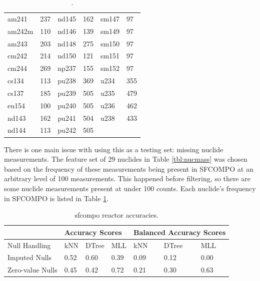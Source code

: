 \begin{table}[!ht]
  \centering
  \begin{tabular}{|>{\raggedleft}m{0.6in}
                                 m{0.4in}
                  |>{\raggedleft}m{0.6in}
                                 m{0.4in}
                  |>{\raggedleft}m{0.6in}
                                 m{0.4in}|}
    \toprule
    am241  & 237 & nd145 & 162 & sm147 & 97  \\
    am242m & 110 & nd146 & 139 & sm149 & 97  \\
    am243  & 203 & nd148 & 275 & sm150 & 97  \\
    cm242  & 214 & nd150 & 121 & sm151 & 97  \\
    cm244  & 269 & np237 & 155 & sm152 & 97  \\
    cs134  & 113 & pu238 & 369 & u234  & 355 \\
    cs137  & 185 & pu239 & 505 & u235  & 479 \\
    eu154  & 100 & pu240 & 505 & u236  & 462 \\
    nd143  & 162 & pu241 & 504 & u238  & 433 \\
    nd144  & 113 & pu242 & 505 &       &     \\ \bottomrule
  \end{tabular}
  \caption{.}
  \label{tbl:missing}
\end{table}

There is one main issue with using this as a testing set: missing nuclide
measurements.  The feature set of 29 nuclides in Table \ref{tbl:nucmass} was
chosen based on the frequency of these measurements being present in
\gls{SFCOMPO} at an arbitrary level of 100 measurements. This happened before
filtering, so there are some nuclide measurements present at under 100 counts.
Each nuclide's frequency in \gls{SFCOMPO} is listed in Table \ref{tbl:missing}.



\begin{table}[!ht]
  \centering
  \begin{tabular}{@{}l|lll|lll@{}}
  \toprule
                   & \multicolumn{3}{l|}{Accuracy Scores} & \multicolumn{3}{l}{Balanced Accuracy Scores} \\ \toprule
  Null Handling    & kNN        & DTree      & MLL       & kNN           & DTree         & MLL           \\ \midrule
  Imputed Nulls    & 0.52       & 0.60       & 0.39      & 0.09          & 0.12          & 0.00          \\
  Zero-value Nulls & 0.45       & 0.42       & 0.72      & 0.21          & 0.30          & 0.63          \\ \bottomrule
  \end{tabular}
  \caption{sfcompo reactor accuracies.}
  \label{tbl:sfcorxtr}
\end{table}

